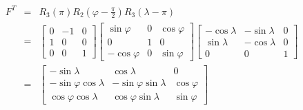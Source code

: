 		\begin{equation}\label{eq:9.29}

		\begin{array}{rcl}

			F^T &=& R_3(\pi)R_2(\varphi-\frac{\pi}{2})R_3(\lambda-\pi) \\

				&=&\begin{bmatrix}

						0 & -1 & 0 \\

						1 &  0 & 0 \\

						0 &  0 & 1

					\end{bmatrix}

					\begin{bmatrix}

					\sin \varphi & 0 & \cos \varphi \\

					0 & 1 & 0 \\

					-\cos \varphi& 0 & \sin \varphi

					\end{bmatrix}

					\begin{bmatrix}

					-\cos \lambda & -\sin \lambda & 0 \\

					\sin \lambda & -\cos \lambda & 0 \\

					0 & 			0 & 1 

					\end{bmatrix} \\

				 &=&\begin{bmatrix}

					-\sin \lambda & \cos \lambda & 0 \\

					-\sin \varphi \cos \lambda & -\sin \varphi \sin \lambda & \cos \varphi \\

					\cos \varphi \cos \lambda & \cos \varphi \sin \lambda & \sin \varphi 

					\end{bmatrix}

		\end{array}	

		\end{equation}

